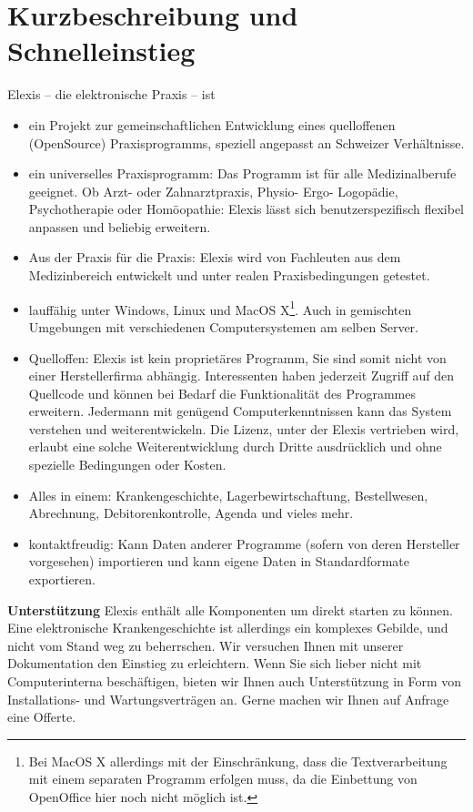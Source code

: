 \documentclass[paper=a4,BCOR8.25mm,twoside]{scrbook}
\begin{document}
\chapter{Kurzbeschreibung und Schnelleinstieg}
Elexis -- die elektronische Praxis -- ist
\begin{itemize}
	\item ein Projekt zur gemeinschaftlichen Entwicklung eines quelloffenen (OpenSource) Praxisprogramms,
speziell angepasst an Schweizer Verhältnisse.
	\item  ein universelles Praxisprogramm:  Das Programm ist für alle Medizinalberufe geeignet. Ob Arzt- oder
Zahnarztpraxis, Physio- Ergo- Logopädie, Psychotherapie oder Homöopathie: Elexis lässt sich benutzerspezifisch
flexibel anpassen und beliebig erweitern.
	\item Aus der Praxis für die Praxis: Elexis wird von Fachleuten aus dem Medizinbereich entwickelt und unter realen Praxisbedingungen getestet.

	\item lauffähig unter Windows, Linux und MacOS X\footnote{Bei MacOS X
	allerdings mit der Einschränkung, dass die Textverarbeitung mit einem separaten
	Programm erfolgen muss, da die Einbettung von OpenOffice hier noch nicht
	möglich ist.}. Auch
	in gemischten Umgebungen mit verschiedenen Computersystemen am selben Server.
	\item Quelloffen: Elexis ist kein proprietäres Programm, Sie sind somit nicht
	von einer Herstellerfirma abhängig. Interessenten haben jederzeit Zugriff auf
	den Quellcode und können bei Bedarf die Funktionalität des Programmes erweitern.
Jedermann mit genügend Computerkenntnissen kann das System verstehen und weiterentwickeln.
Die Lizenz, unter der Elexis vertrieben wird, erlaubt eine solche Weiterentwicklung durch Dritte ausdrücklich
und ohne spezielle Bedingungen oder Kosten.

	\item Alles in einem: Krankengeschichte, Lagerbewirtschaftung,
	Bestellwesen, Abrechnung, Debitorenkontrolle, Agenda und vieles mehr.
  	\item kontaktfreudig: Kann Daten anderer Programme (sofern von deren
 	Hersteller vorgesehen) importieren und kann eigene Daten in Standardformate
 	exportieren.
\end{itemize}
\pagebreak[3]
\textbf{Unterstützung}
Elexis enthält alle Komponenten um direkt starten zu können.
Eine elektronische Krankengeschichte ist allerdings ein komplexes Gebilde, und nicht vom Stand weg zu
beherrschen. Wir versuchen Ihnen mit unserer Dokumentation den Einstieg zu erleichtern. Wenn Sie sich lieber nicht mit Computerinterna beschäftigen, bieten wir Ihnen auch Unterstützung in Form von Installations- und Wartungsverträgen
an. Gerne machen wir Ihnen auf Anfrage eine Offerte.
\end{document}
